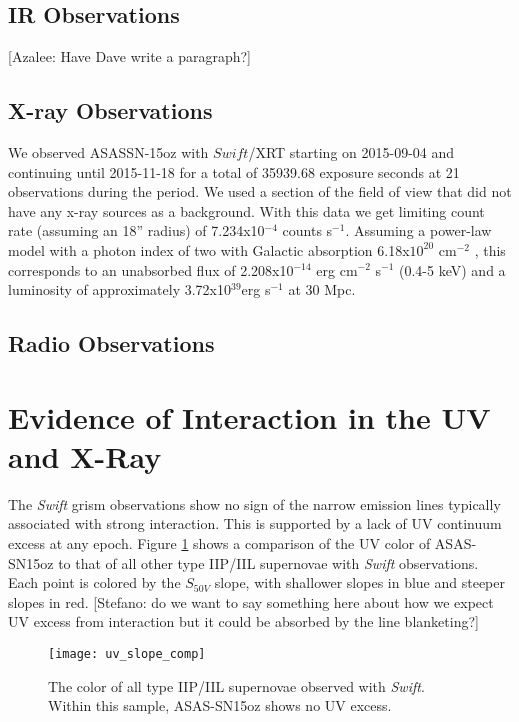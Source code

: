 \documentclass[preprint]{aastex61}
\newcommand{\azaleecomment}[1]{{\color{red} [{#1}]}}
\newcommand{\Azalee}[1]{\azaleecomment{Azalee: #1}}
\newcommand{\stefanocomment}[1]{{\color{cyan} [{#1}]}}
\newcommand{\Stefano}[1]{\stefanocomment{Stefano: #1}}
\begin{document}
\subsection{IR Observations}
\Azalee{Have Dave write a paragraph?}

\subsection{X-ray Observations}
We observed ASASSN-15oz with $\textit{Swift}$/XRT starting on 2015-09-04 and continuing until 2015-11-18 for a total of 35939.68 exposure seconds at 21 observations during the period. 
We used a section of the field of view that did not have any x-ray sources as a background. 
With this data we get  limiting count rate (assuming an 18'' radius) of 7.234x10$^{-4}$ counts s$^{-1}$. 
Assuming a power-law model with a photon index of two with Galactic absorption 6.18x$10^{20}$ cm$^{-2}$ \citep{2005kalberla}, this corresponds to an unabsorbed flux of 2.208x10$^{-14}$ erg cm$^{-2}$ s$^{-1}$ (0.4-5 keV) and a luminosity of approximately 3.72x10$^{39}$erg s$^{-1}$ at 30 Mpc.
\subsection{Radio Observations}

\section{Evidence of Interaction in the UV and X-Ray}
The \textit{Swift} grism observations show no sign of the narrow emission lines typically associated with strong interaction.
This is supported by a lack of UV continuum excess at any epoch. 
Figure \ref{fig:UVColor} shows a comparison of the UV color of ASAS-SN15oz to that of all other type IIP/IIL supernovae with \textit{Swift} observations.
Each point is colored by the $S_{50V}$ slope, with shallower slopes in blue and steeper slopes in red. 
\Stefano{do we want to say something here about how we expect UV excess from interaction but it could be absorbed by the line blanketing?}
\begin{figure}[h!]
\begin{center}
\texttt{[image: uv\_slope\_comp]} %
\caption{The color of all type IIP/IIL supernovae observed with \textit{Swift}. Within this sample, ASAS-SN15oz shows no UV excess.}
\label{fig:UVColor}
\end{center}
\end{figure}
\end{document}
